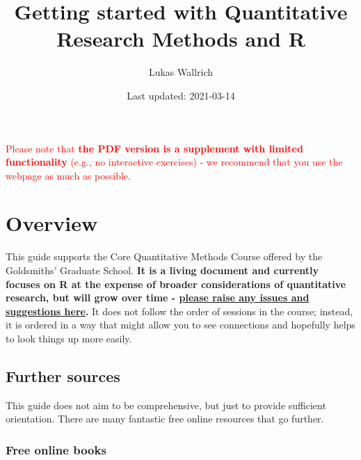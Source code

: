 \documentclass[
]{book}
\title{Getting started with Quantitative Research Methods and R}
\author{Lukas Wallrich}
\date{Last updated: 2021-03-14}
\begin{document}
\maketitle

{
\hypersetup{linkcolor=}
\setcounter{tocdepth}{1}
\tableofcontents
}
\newpage

\textcolor{red}{Please note that \textbf{the PDF version is a supplement with limited functionality} (e.g., no interactive exercises) - we recommend that you use the webpage as much as possible}.

\hypertarget{overview}{%
\chapter*{Overview}\label{overview}}

This guide supports the Core Quantitative Methods Course offered by the Goldsmiths' Graduate School. \textbf{It is a living document and currently focuses on R at the expense of broader considerations of quantitative research, but will grow over time - \href{https://github.com/LukasWallrich/GoldCoreQuants/issues}{please raise any issues and suggestions here}.} It does not follow the order of sessions in the course; instead, it is ordered in a way that might allow you to see connections and hopefully helps to look things up more easily.

\hypertarget{further-sources}{%
\section{Further sources}\label{further-sources}}

This guide does not aim to be comprehensive, but just to provide sufficient orientation. There are many fantastic free online resources that go further.

\hypertarget{free-online-books}{%
\subsection{Free online books}\label{free-online-books}}
\end{document}
